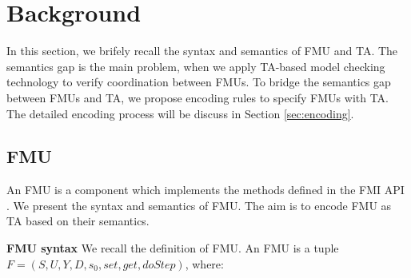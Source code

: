 \section{Background}
\label{sec:fmi}
In this section, we brifely recall the syntax and semantics of FMU and TA. The semantics gap is the main problem, when we apply TA-based model checking technology to verify coordination between FMUs. To bridge the semantics gap between FMUs and TA, we propose encoding rules to specify FMUs with TA. The detailed encoding process will be discuss in Section \ref{sec:encoding}. 

\subsection{FMU}
An FMU is a component which implements the methods defined in the FMI API \cite{Tripakis15}. We present the syntax and semantics of FMU. The aim is to encode FMU as TA based on their semantics.
\begin{definition}
\textbf{FMU syntax}
We recall the definition of FMU. An FMU is a tuple $F=(S,U,Y,D,s_{0},set,get,doStep)$, where:
\end{definition}
